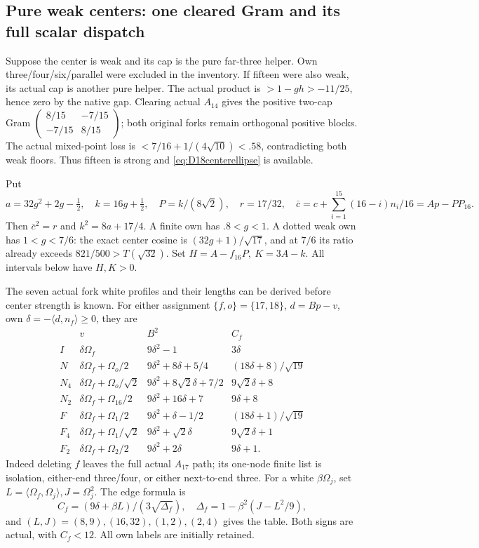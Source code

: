 \documentclass[11pt]{article}
\theoremstyle{definition}
\theoremstyle{remark}
\newcommand{\ip}[2]{\langle #1,#2\rangle}
\begin{document}
\subsection{Pure weak centers: one cleared Gram and its full scalar dispatch}
\label{app:D18purecenter}
Suppose the center is weak and its cap is the pure far-three helper.
Own three/four/six/parallel were excluded in the inventory.
If fifteen were also weak, its actual cap is another pure helper.
The actual product is \(>1-gh>-11/25\), hence zero by the native gap.
Clearing actual \(A_{14}\) gives the positive two-cap Gram
\(\left(\begin{smallmatrix}8/15&-7/15\\-7/15&8/15\end{smallmatrix}\right)\);
both original forks remain orthogonal positive blocks.
The actual mixed-point loss is \(<7/16+1/(4\sqrt{10})<.58\),
contradicting both weak floors. Thus fifteen is strong and
\eqref{eq:D18centerellipse} is available.

Put
\[
 a=32g^2+2g-\tfrac12,\quad k=16g+\tfrac12,\quad
 P=k/(8\sqrt2),\quad r=17/32,\quad
 \bar c=c+\sum_{i=1}^{15}(16-i)n_i/16=Ap-PP_{16}.
\]
Then \(\bar c^2=r\) and \(k^2=8a+17/4\).
A finite own has \(.8<g<1\).
A dotted weak own has \(1<g<7/6\): the exact center cosine
is \((32g+1)/\sqrt{17}\), and at \(7/6\) its ratio already
exceeds \(821/500>T(\sqrt{32})\).
Set \(H=A-f_{16}P,\ K=3A-k\).
All intervals below have \(H,K>0\).

The seven actual fork white profiles and their lengths can be derived
before center strength is known.
For either assignment \(\{f,o\}=\{17,18\}\),
\(d=Bp-v\), own \(\delta=-\ip d{n_f}\geq0\), they are
\[
\begin{array}{c|c|c|c}
 &v&B^2&C_f\\ \hline
I&\delta\Omega_f&9\delta^2-1&3\delta\\
N&\delta\Omega_f+\Omega_o/2&9\delta^2+8\delta+5/4&(18\delta+8)/\sqrt{19}\\
N_4&\delta\Omega_f+\Omega_o/\sqrt2&9\delta^2+8\sqrt2\delta+7/2&9\sqrt2\delta+8\\
N_2&\delta\Omega_f+\Omega_{16}/2&9\delta^2+16\delta+7&9\delta+8\\
F&\delta\Omega_f+\Omega_1/2&9\delta^2+\delta-1/2&(18\delta+1)/\sqrt{19}\\
F_4&\delta\Omega_f+\Omega_1/\sqrt2&9\delta^2+\sqrt2\delta&9\sqrt2\delta+1\\
F_2&\delta\Omega_f+\Omega_2/2&9\delta^2+2\delta&9\delta+1 .
\end{array}
\]
Indeed deleting \(f\) leaves the full actual \(A_{17}\) path;
its one-node finite list is isolation, either-end three/four,
or either next-to-end three.
For a white \(\beta\Omega_j\), set
\(L=\ip{\Omega_f}{\Omega_j},J=\Omega_j^2\).
The edge formula is
\[
 C_f=(9\delta+\beta L)/(3\sqrt{\Delta_f}),\quad
 \Delta_f=1-\beta^2(J-L^2/9),
\]
and \((L,J)=(8,9),(16,32),(1,2),(2,4)\) gives the table.
Both signs are actual, with \(C_f<12\).
All own labels are initially retained.
\end{document}
